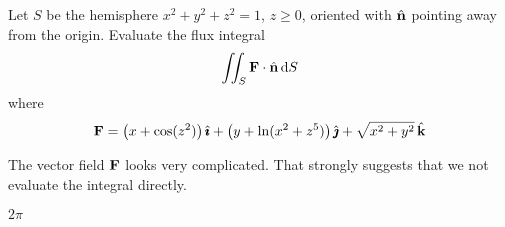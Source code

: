 \begin{question}[M317 2005D] %
Let $S$ be the hemisphere $x^2 + y^2 + z^2 = 1$, $z\ge 0$, 
oriented with $\hat{\mathbf{n}}$ pointing away from the origin. Evaluate the 
flux integral
\begin{equation*}
\iint_S \mathbf{F}\cdot\hat{\mathbf{n}}\, \mathrm{d}S
\end{equation*}
where
\begin{equation*}
\mathbf{F} = \big(x + \cos(z^2)\big)\,\hat{\pmb{\imath}} + \big(y + \ln(x^2 + z^5)\big)\,\hat{\pmb{\jmath}} 
           + \sqrt{x^2 + y^2}\,\hat{\mathbf{k}}
\end{equation*}
\end{question}

\begin{hint} 
The vector field $\mathbf{F}$ looks very complicated. 
That strongly suggests that we not evaluate the integral directly.
\end{hint}

\begin{answer} 
$2\pi$
\end{answer}

